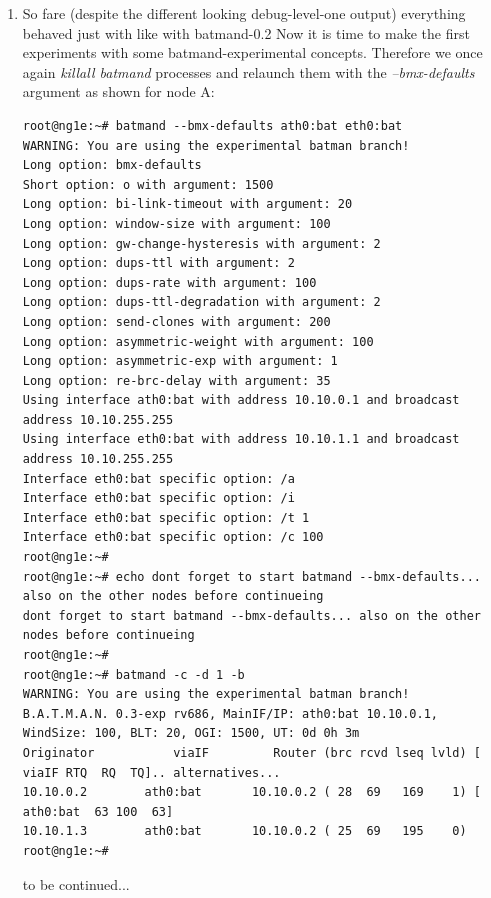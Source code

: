 \documentclass[11pt]{article}
\begin{document}
\begin{enumerate}
\item So fare (despite the different looking debug-level-one output) everything behaved just with like with batmand-0.2
%
Now it is time to make the first experiments with some batmand-experimental concepts.
Therefore we once again \emph{killall batmand} processes and relaunch them with the \emph{--bmx-defaults} argument as shown for node A:

\begin{small} \begin{verbatim}
root@ng1e:~# batmand --bmx-defaults ath0:bat eth0:bat
WARNING: You are using the experimental batman branch!
Long option: bmx-defaults
Short option: o with argument: 1500
Long option: bi-link-timeout with argument: 20
Long option: window-size with argument: 100
Long option: gw-change-hysteresis with argument: 2
Long option: dups-ttl with argument: 2
Long option: dups-rate with argument: 100
Long option: dups-ttl-degradation with argument: 2
Long option: send-clones with argument: 200
Long option: asymmetric-weight with argument: 100
Long option: asymmetric-exp with argument: 1
Long option: re-brc-delay with argument: 35
Using interface ath0:bat with address 10.10.0.1 and broadcast address 10.10.255.255
Using interface eth0:bat with address 10.10.1.1 and broadcast address 10.10.255.255
Interface eth0:bat specific option: /a
Interface eth0:bat specific option: /i
Interface eth0:bat specific option: /t 1
Interface eth0:bat specific option: /c 100
root@ng1e:~#
root@ng1e:~# echo dont forget to start batmand --bmx-defaults... also on the other nodes before continueing
dont forget to start batmand --bmx-defaults... also on the other nodes before continueing
root@ng1e:~#
root@ng1e:~# batmand -c -d 1 -b
WARNING: You are using the experimental batman branch!
B.A.T.M.A.N. 0.3-exp rv686, MainIF/IP: ath0:bat 10.10.0.1, WindSize: 100, BLT: 20, OGI: 1500, UT: 0d 0h 3m
Originator           viaIF         Router (brc rcvd lseq lvld) [    viaIF RTQ  RQ  TQ].. alternatives...
10.10.0.2        ath0:bat       10.10.0.2 ( 28  69   169    1) [ ath0:bat  63 100  63]
10.10.1.3        ath0:bat       10.10.0.2 ( 25  69   195    0)
root@ng1e:~# 

\end{verbatim} \end{small}

to be continued...


\end{enumerate}



\label{sec:howto-gw}
\end{document}
